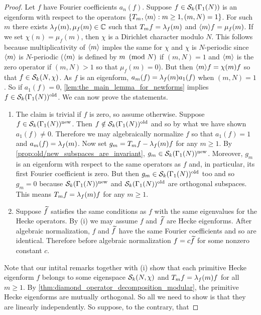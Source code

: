       \begin{proof}
        Let $f$ have Fourier coefficients $a_{n}(f)$. Suppose $f \in \mathcal{S}_{k}(\Gamma_{1}(N))$ is an eigenform with respect to the operators $\{T_{m},\langle m\rangle:m \ge 1, (m,N) = 1\}$. For such $m$ there exists $\lambda_{f}(m),\mu_{f}(m) \in \mathbb{C}$ such that $T_{m}f = \lambda_{f}(m)$ and $\langle m\rangle f = \mu_{f}(m)$. If we set $\chi(n) = \mu_{f}(m)$, then $\chi$ is a Dirichlet character modulo $N$. This follows because multiplicativity of $\langle m\rangle$ imples the same for $\chi$ and $\chi$ is $N$-periodic since $\langle m\rangle$ is $N$-periodic ($\langle m\rangle$ is defined by $m \ \left(\text{mod }N\right)$ if $(m,N) = 1$ and $\langle m\rangle$ is the zero operator if $(m,N) > 1$ so that $\mu_{f}(m) = 0$). But then $\langle m\rangle f = \chi(m)f$ so that $f \in \mathcal{S}_{k}(N,\chi)$. As $f$ is an eigenform, $a_{m}(f) = \lambda_{f}(m)a_{1}(f)$ when $(m,N) = 1$. So if $a_{1}(f) = 0$, \cref{lem:the_main_lemma_for_newforms} implies $f \in \mathcal{S}_{k}(\Gamma_{1}(N))^{\mathrm{old}}$. We can now prove the statements.
        \begin{enumerate}[label=(\roman*)]
          \item The claim is trivial if $f$ is zero, so assume otherwise. Suppose $f \in \mathcal{S}_{k}(\Gamma_{1}(N))^{\mathrm{new}}$. Then $f \notin \mathcal{S}_{k}(\Gamma_{1}(N))^{\mathrm{old}}$ and so by what we have shown $a_{1}(f) \neq 0$. Therefore we may algebraically normalize $f$ so that $a_{1}(f) = 1$ and $a_{m}(f) = \lambda_{f}(m)$. Now set $g_{m} = T_{m}f-\lambda_{f}(m)f$ for any $m \ge 1$. By \cref{prop:old/new_subspaces_are_invariant}, $g_{m} \in \mathcal{S}_{k}(\Gamma_{1}(N))^{\mathrm{new}}$. Moreover, $g_{m}$ is an eigenform with respect to the same operators as $f$ and, in particular, its first Fourier coefficient is zero. But then $g_{m} \in \mathcal{S}_{k}(\Gamma_{1}(N))^{\mathrm{old}}$ too and so $g_{m} = 0$ because $\mathcal{S}_{k}(\Gamma_{1}(N))^{\mathrm{new}}$ and $\mathcal{S}_{k}(\Gamma_{1}(N))^{\mathrm{old}}$ are orthogonal subspaces. This means $T_{m}f = \lambda_{f}(m)f$ for any $m \ge 1$.
          \item Suppose $\widetilde{f}$ satisfies the same conditions as $f$ with the same eigenvalues for the Hecke operators. By (i) we may assume $f$ and $\widetilde{f}$ are Hecke eigenforms. After algebraic normalization, $f$ and $\widetilde{f}$ have the same Fourier coefficients and so are identical. Therefore before algebraic normalization $f = c\widetilde{f}$ for some nonzero constant $c$.
        \end{enumerate}
        Note that our intital remarks together with (i) show that each primitive Hecke eigenform $f$ belongs to some eigenspace $\mathcal{S}_{k}(N,\chi)$ and $T_{m}f = \lambda_{f}(m)f$ for all $m \ge 1$. By \cref{thm:diamond_operator_decomposition_modular}, the primitive Hecke eigenforms are mutually orthogonal. So all we need to show is that they are linearly independently. So suppose, to the contrary, that

\end{proof}
